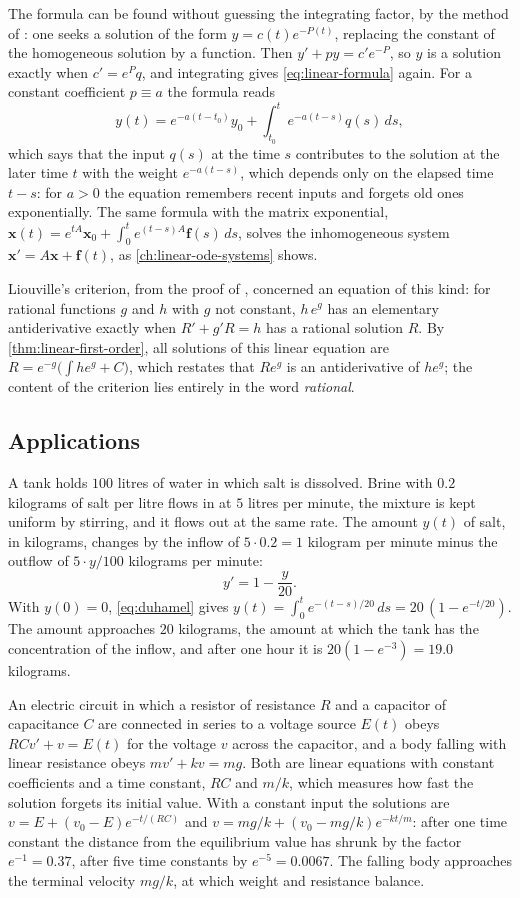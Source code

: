 The formula can be found without guessing the integrating factor, by the method of : one seeks a solution of the form $y=c(t)e^{-P(t)}$, replacing the constant of the homogeneous solution by a function. Then $y'+py=c'e^{-P}$, so $y$ is a solution exactly when $c'=e^Pq$, and integrating gives \eqref{eq:linear-formula} again. For a constant coefficient $p\equiv a$ the formula reads
\begin{equation}
y(t)=e^{-a(t-t_0)}y_0+\int_{t_0}^te^{-a(t-s)}q(s)\,ds ,
\label{eq:duhamel}
\end{equation}
which says that the input $q(s)$ at the time $s$ contributes to the solution at the later time $t$ with the weight $e^{-a(t-s)}$, which depends only on the elapsed time $t-s$: for $a>0$ the equation remembers recent inputs and forgets old ones exponentially. The same formula with the matrix exponential, $\mathbf x(t)=e^{tA}\mathbf x_0+\int_0^te^{(t-s)A}\mathbf f(s)\,ds$, solves the inhomogeneous system $\mathbf x'=A\mathbf x+\mathbf f(t)$, as \cref{ch:linear-ode-systems} shows.

Liouville's criterion, from the proof of , concerned an equation of this kind: for rational functions $g$ and $h$ with $g$ not constant, $h\,e^g$ has an elementary antiderivative exactly when $R'+g'R=h$ has a rational solution $R$. By \cref{thm:linear-first-order}, all solutions of this linear equation are $R=e^{-g}\bigl(\int he^g+C\bigr)$, which restates that $Re^g$ is an antiderivative of $he^g$; the content of the criterion lies entirely in the word \emph{rational}.

\subsection{Applications}

A tank holds $100$ litres of water in which salt is dissolved. Brine with $0.2$ kilograms of salt per litre flows in at $5$ litres per minute, the mixture is kept uniform by stirring, and it flows out at the same rate. The amount $y(t)$ of salt, in kilograms, changes by the inflow of $5\cdot0.2=1$ kilogram per minute minus the outflow of $5\cdot y/100$ kilograms per minute:
\[
y'=1-\frac y{20} .
\]
With $y(0)=0$, \eqref{eq:duhamel} gives $y(t)=\int_0^te^{-(t-s)/20}\,ds=20\,(1-e^{-t/20})$. The amount approaches $20$ kilograms, the amount at which the tank has the concentration of the inflow, and after one hour it is $20(1-e^{-3})=19.0$ kilograms.

An electric circuit in which a resistor of resistance $R$ and a capacitor of capacitance $C$ are connected in series to a voltage source $E(t)$ obeys $RCv'+v=E(t)$ for the voltage $v$ across the capacitor, and a body falling with linear resistance obeys $mv'+kv=mg$. Both are linear equations with constant coefficients and a time constant, $RC$ and $m/k$, which measures how fast the solution forgets its initial value. With a constant input the solutions are $v=E+(v_0-E)e^{-t/(RC)}$ and $v=mg/k+(v_0-mg/k)e^{-kt/m}$: after one time constant the distance from the equilibrium value has shrunk by the factor $e^{-1}=0.37$, after five time constants by $e^{-5}=0.0067$. The falling body approaches the terminal velocity $mg/k$, at which weight and resistance balance.

